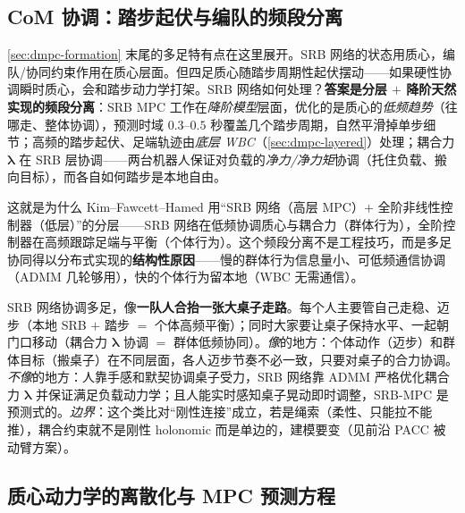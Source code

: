 \subsection{CoM 协调：踏步起伏与编队的频段分离}
\label{sec:dmpc-com-freq}

\cref{sec:dmpc-formation} 末尾的多足特有点在这里展开。SRB 网络的状态用质心，编队/协同约束作用在质心层面。但四足质心随踏步周期性起伏摆动——如果硬性协调瞬时质心，会和踏步动力学打架。SRB 网络如何处理？\textbf{答案是分层 $+$ 降阶天然实现的频段分离}：SRB MPC 工作在\emph{降阶模型}层面，优化的是质心的\emph{低频趋势}（往哪走、整体协调），预测时域 $0.3$–$0.5$ 秒覆盖几个踏步周期，自然平滑掉单步细节；高频的踏步起伏、足端轨迹由\emph{底层 WBC}（\cref{sec:dmpc-layered}）处理；耦合力 $\boldsymbol{\lambda}$ 在 SRB 层协调——两台机器人保证对负载的\emph{净力/净力矩}协调（托住负载、搬向目标），而各自如何踏步是本地自由。

\begin{insight}[把协同放降阶层、把平衡放全阶层 $=$ 按频率分解控制任务]\label{ins:dmpc-freq-decompose}
这就是为什么 Kim--Fawcett--Hamed\cite{kim2023layered} 用“SRB 网络（高层 MPC）$+$ 全阶非线性控制器（低层）”的分层——SRB 网络在低频协调质心与耦合力（群体行为），全阶控制器在高频跟踪足端与平衡（个体行为）。这个频段分离不是工程技巧，而是多足协同得以分布式实现的\textbf{结构性原因}——慢的群体行为信息量小、可低频通信协调（ADMM 几轮够用），快的个体行为留本地（WBC 无需通信）。
\end{insight}

\begin{insight}\label{ins:dmpc-table}
SRB 网络协调多足，像\textbf{一队人合抬一张大桌子走路}。每个人主要管自己走稳、迈步（本地 SRB $+$ 踏步 $=$ 个体高频平衡）；同时大家要让桌子保持水平、一起朝门口移动（耦合力 $\boldsymbol{\lambda}$ 协调 $=$ 群体低频协同）。\emph{像}的地方：个体动作（迈步）和群体目标（搬桌子）在不同层面，各人迈步节奏不必一致，只要对桌子的合力协调。\emph{不像}的地方：人靠手感和默契协调桌子受力，SRB 网络靠 ADMM 严格优化耦合力 $\boldsymbol{\lambda}$ 并保证满足负载动力学；且人能实时感知桌子晃动即时调整，SRB-MPC 是预测式的。\emph{边界}：这个类比对“刚性连接”成立，若是绳索（柔性、只能拉不能推），耦合约束就不是刚性 holonomic 而是单边的，建模要变（见前沿 PACC 被动臂方案\cite{turrisi2024pacc}）。
\end{insight}

\subsection{质心动力学的离散化与 MPC 预测方程}
\label{sec:dmpc-discretize}

